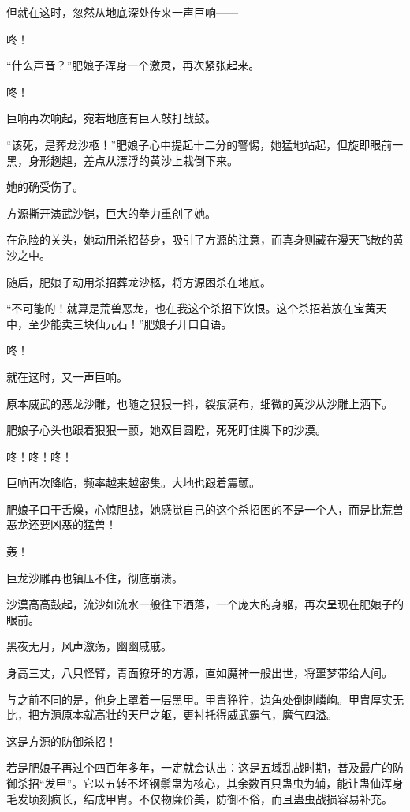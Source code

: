 \begin{this_body}
但就在这时，忽然从地底深处传来一声巨响——

咚！

“什么声音？”肥娘子浑身一个激灵，再次紧张起来。

咚！

巨响再次响起，宛若地底有巨人敲打战鼓。

“该死，是葬龙沙柩！”肥娘子心中提起十二分的警惕，她猛地站起，但旋即眼前一黑，身形趔趄，差点从漂浮的黄沙上栽倒下来。

她的确受伤了。

方源撕开演武沙铠，巨大的拳力重创了她。

在危险的关头，她动用杀招替身，吸引了方源的注意，而真身则藏在漫天飞散的黄沙之中。

随后，肥娘子动用杀招葬龙沙柩，将方源困杀在地底。

“不可能的！就算是荒兽恶龙，也在我这个杀招下饮恨。这个杀招若放在宝黄天中，至少能卖三块仙元石！”肥娘子开口自语。

咚！

就在这时，又一声巨响。

原本威武的恶龙沙雕，也随之狠狠一抖，裂痕满布，细微的黄沙从沙雕上洒下。

肥娘子心头也跟着狠狠一颤，她双目圆瞪，死死盯住脚下的沙漠。

咚！咚！咚！

巨响再次降临，频率越来越密集。大地也跟着震颤。

肥娘子口干舌燥，心惊胆战，她感觉自己的这个杀招困的不是一个人，而是比荒兽恶龙还要凶恶的猛兽！

轰！

巨龙沙雕再也镇压不住，彻底崩溃。

沙漠高高鼓起，流沙如流水一般往下洒落，一个庞大的身躯，再次呈现在肥娘子的眼前。

黑夜无月，风声激荡，幽幽戚戚。

身高三丈，八只怪臂，青面獠牙的方源，直如魔神一般出世，将噩梦带给人间。

与之前不同的是，他身上罩着一层黑甲。甲胄狰狞，边角处倒刺嶙峋。甲胄厚实无比，把方源原本就高壮的天尸之躯，更衬托得威武霸气，魔气四溢。

这是方源的防御杀招！

若是肥娘子再过个四百年多年，一定就会认出：这是五域乱战时期，普及最广的防御杀招“发甲”。它以五转不坏钢鬃蛊为核心，其余数百只蛊虫为辅，能让蛊仙浑身毛发顷刻疯长，结成甲胄。不仅物廉价美，防御不俗，而且蛊虫战损容易补充。


\end{this_body}
